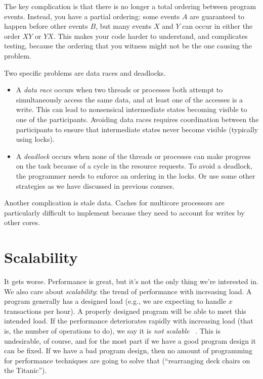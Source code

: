 \documentclass[a4paper]{report}
\begin{document}
The key complication is that there is no longer a total ordering between
program events. Instead, you have a partial ordering: some events $A$
are guaranteed to happen before other events $B$, but many events $X$ 
and $Y$ can occur in either the order $XY$ or $YX$. This makes your code
harder to understand, and complicates testing, because the ordering that
you witness might not be the one causing the problem.

Two specific problems are data races and deadlocks. 
\begin{itemize}
\item A
\emph{data race} occurs when two threads or processes both attempt to
simultaneously access the same data, and at least one of the accesses
is a write. This can lead to nonsensical intermediate states becoming
visible to one of the participants. Avoiding data races requires
coordination between the participants to ensure that intermediate
states never become visible (typically using locks). 
\item A \emph{deadlock}
occurs when none of the threads or processes can make progress on the
task because of a cycle in the resource requests. To avoid a deadlock,
the programmer needs to enforce an ordering in the locks. Or use some other strategies as we have discussed in previous courses.
\end{itemize}

Another complication is stale data. Caches for multicore processors
are particularly difficult to implement because they need to account
for writes by other cores.

\section*{Scalability}

It gets worse. Performance is great, but it's not the only thing we're interested in. We also care about \textit{scalability}: the trend of performance with increasing load. A program generally has a designed load (e.g., we are expecting to handle $x$ transactions per hour). A properly designed program will be able to meet this intended load. If the performance deteriorates rapidly with increasing load (that is, the number of operations to do), we say it is \textit{not scalable} ~\cite{swps}. This is undesirable, of course, and for the most part if we have a good program design it can be fixed. If we have a bad program design, then no amount of programming for performance techniques are going to solve that (``rearranging deck chairs on the Titanic'').
\end{document}
